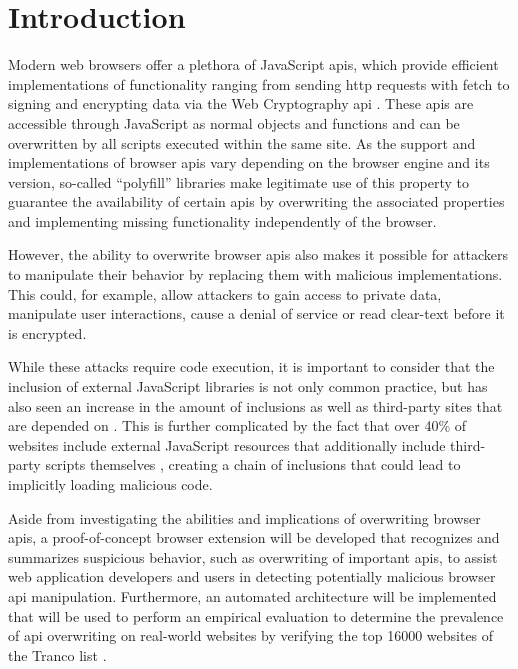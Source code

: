 \chapter{Introduction}
\label{sec.introduction}


Modern web browsers offer a plethora of JavaScript \acsp{api}, which provide efficient implementations of functionality ranging from sending \acs{http} requests with fetch \cite{fetch} to signing and encrypting data via the Web Cryptography \acs{api} \cite{crypto}.
These \acsp{api} are accessible through JavaScript as normal objects and functions and can be overwritten by all scripts executed within the same site. As the support and implementations of browser \acsp{api} vary depending on the browser engine and its version, so-called “polyfill” libraries make legitimate use of this property to guarantee the availability of certain \acsp{api} by overwriting the associated properties and implementing missing functionality independently of the browser.

However, the ability to overwrite browser \acsp{api} also makes it possible for attackers to manipulate their behavior by replacing them with malicious implementations. This could, for example, allow attackers to gain access to private data, manipulate user interactions, cause a denial of service or read clear-text before it is encrypted.

While these attacks require code execution, it is important to consider that the inclusion of external JavaScript libraries is not only common practice, but has also seen an increase in the amount of inclusions as well as third-party sites that are depended on \cite{JSinclusions}. This is further complicated by the fact that over 40\% of websites include external JavaScript resources that additionally include third-party scripts themselves \cite{ThirdPartyResources}, creating a chain of inclusions that could lead to implicitly loading malicious code.

Aside from investigating the abilities and implications of overwriting browser \acsp{api}, a proof-of-concept browser extension will be developed that recognizes and summarizes suspicious behavior, such as overwriting of important \acsp{api}, to assist web application developers and users in detecting potentially malicious browser \acs{api} manipulation.
Furthermore, an automated architecture will be implemented that will be used to perform an empirical evaluation to determine the prevalence of \acs{api} overwriting on real-world websites by verifying the top \num[round-precision=0]{16000} websites of the Tranco list \cite{Tranco}.
